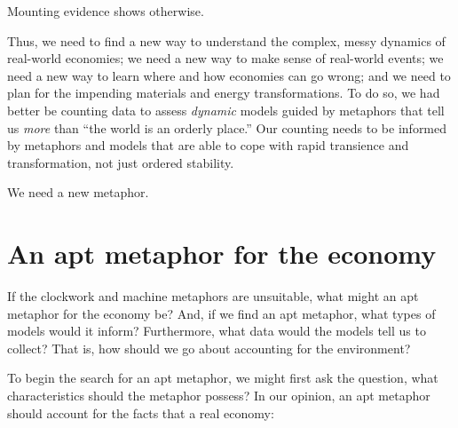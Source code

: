 Mounting evidence shows otherwise.

Thus, we need to find a new way to understand the complex, 
messy dynamics of real-world economies;
we need a new way to make sense of real-world events;
we need a new way to learn where and how economies can go wrong; and
we need to plan for the impending materials and energy transformations.
To do so, we had better be counting data to assess \emph{dynamic} models
guided by metaphors that tell us \emph{more} than ``the world is an orderly place.''
Our counting needs to be informed by metaphors and models that are
able to cope with rapid transience and transformation,
not just ordered stability.

We need a new metaphor.


\section{An apt metaphor for the economy}
\label{sec:apt_metaphor}

If the clockwork and machine metaphors are unsuitable, 
what might an apt metaphor for the economy be?
And, if we find an apt metaphor, what types of models would it inform?
Furthermore, what data would the models tell us to collect?
That is, how should we go about accounting for the environment?

To begin the search for an apt metaphor, 
we might first ask the question, 
what characteristics should the metaphor possess?
In our opinion, an apt metaphor should account for the facts 
that a real economy:

